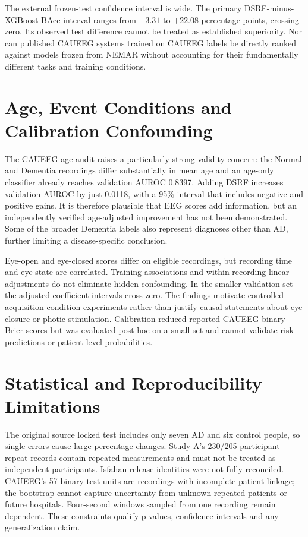 The external frozen-test confidence interval is wide. The primary DSRF-minus-XGBoost BAcc interval ranges from $-3.31$ to $+22.08$ percentage points, crossing zero. Its observed test difference cannot be treated as established superiority. Nor can published CAUEEG systems trained on CAUEEG labels be directly ranked against models frozen from NEMAR without accounting for their fundamentally different tasks and training conditions.

\section{Age, Event Conditions and Calibration Confounding}
The CAUEEG age audit raises a particularly strong validity concern: the Normal and Dementia recordings differ substantially in mean age and an age-only classifier already reaches validation AUROC 0.8397. Adding DSRF increases validation AUROC by just 0.0118, with a 95\% interval that includes negative and positive gains. It is therefore plausible that EEG scores add information, but an independently verified age-adjusted improvement has not been demonstrated. Some of the broader Dementia labels also represent diagnoses other than AD, further limiting a disease-specific conclusion.

Eye-open and eye-closed scores differ on eligible recordings, but recording time and eye state are correlated. Training associations and within-recording linear adjustments do not eliminate hidden confounding. In the smaller validation set the adjusted coefficient intervals cross zero. The findings motivate controlled acquisition-condition experiments rather than justify causal statements about eye closure or photic stimulation. Calibration reduced reported CAUEEG binary Brier scores but was evaluated post-hoc on a small set and cannot validate risk predictions or patient-level probabilities.

\section{Statistical and Reproducibility Limitations}
The original source locked test includes only seven AD and six control people, so single errors cause large percentage changes. Study A's 230/205 participant-repeat records contain repeated measurements and must not be treated as independent participants. Isfahan release identities were not fully reconciled. CAUEEG's 57 binary test units are recordings with incomplete patient linkage; the bootstrap cannot capture uncertainty from unknown repeated patients or future hospitals. Four-second windows sampled from one recording remain dependent. These constraints qualify p-values, confidence intervals and any generalization claim.

